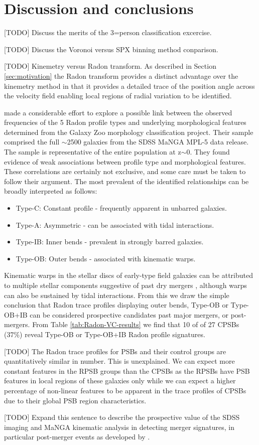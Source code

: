 \section{Discussion and conclusions}
\label{sec:discussion}

[TODO] Discuss the merits of the 3=person classification excercise.

[TODO] Discuss the Voronoi versus SPX binning method conparison.

[TODO] Kinemetry versus Radon transform. As described in Section \ref{sec:motivation} the Radon transform provides a distinct advantage over the kinemetry method in that it provides a detailed trace of the position angle across the velocity field enabling local regions of radial variation to be identified. 


\cite{2018MNRAS.480.2217S} made a considerable effort to explore a possible link between the observed frequencies of the 5 Radon profile types and underlying morphological features determined from the Galaxy Zoo morphology classification project. Their sample comprised the full $\sim$2500 galaxies from the SDSS MaNGA MPL-5 data release. The sample is representative of the entire population at z$\sim$0. They found evidence of weak associations between profile type and morphological features. These correlations are certainly not exclusive, and some care must be taken to follow their argument. The most prevalent of the identified relationships can be broadly interpreted as follows:
\begin{itemize}
    \item Type-C: Constant profile - frequently apparent in unbarred galaxies.
    \item Type-A: Asymmetric - can be associated with tidal interactions.
    \item Type-IB: Inner bends - prevalent in strongly barred galaxies.
    \item Type-OB: Outer bends - associated with kinematic warps.
\end{itemize}
Kinematic warps in the stellar discs of early-type field galaxies can be attributed to multiple stellar components suggestive of past dry mergers \citep{2005AJ....130.2647V}, although warps can also be sustained by tidal interactions.
From this we draw the simple conclusion that Radon trace profiles displaying outer bends, Type-OB or Type-OB+IB can be considered prospective candidates past major mergers, or post-mergers. From Table \ref{tab:Radon-VC-results} we find that 10 of of 27 CPSBs (37\%) reveal Type-OB or Type-OB+IB Radon profile signatures.   

[TODO] The Radon trace profiles for PSBs and their control groups are quantitatively similar in number. This is unexplained. We can expect more constant features in the RPSB groups than the CPSBs as the RPSBs have PSB features in local regions of these galaxies only while we can expect a higher percentage of non-linear features to be apparent in the trace profiles of CPSBs due to their global PSB region characteristics. 

[TODO] Expand this sentence to describe the prospective value of the SDSS imaging and MaNGA kinematic analysis in detecting merger signatures, in particular post-merger events as developed by \cite{2019DDA....5020304N}.